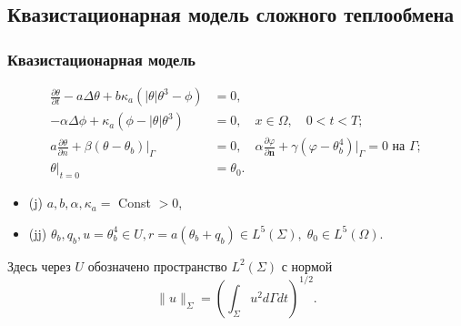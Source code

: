 \subsection{Квазистационарная модель сложного теплообмена}\label{subsec:qst}
\begin{frame}
    \frametitle{Квазистационарная модель}
    \begin{align}
        \frac{\partial\theta}{\partial t} - a\Delta\theta
        + b\kappa_a (|\theta|\theta^3 - \phi) &= 0, \label{eq:1_5:1}\\
        - \alpha\Delta\phi + \kappa_a (\phi - |\theta|\theta^3 ) &= 0,
        \quad x \in \Omega, \quad 0 < t < T ; \label{eq:1_5:1+} \\
        a \frac{\partial \theta}{\partial n}
        +\left.\beta\left(\theta-\theta_{b}\right)\right|_{\Gamma}&=0,
        \quad \alpha \frac{\partial \varphi}{\partial \mathbf{n}} + \gamma
        (\varphi-\theta_b^4)|_{\Gamma} = 0 \text{ на } \Gamma; \label{eq:1_5:2} \\
        \theta|_{t=0} &= \theta_0. \label{eq:1_5:3}
    \end{align}
    \begin {itemize}
        \item (j) $a, b, \alpha, \kappa_{a} =$ Const $>0$,
        \item (jj) $\theta_{b}, q_{b}, u=\theta^4_b \in U, r
        =a\left(\theta_{b}+q_{b}\right) \in L^{5}(\Sigma), \; \theta_{0} \in L^{5}(\Omega)$.
    \end{itemize}

    Здесь через $U$ обозначено пространство $L^{2}(\Sigma)$ с нормой
    \[
        \|u\|_{\Sigma}=\left(\int_{\Sigma} u^{2} d \Gamma d t\right)^{1/2}.
    \]
\end{frame}

